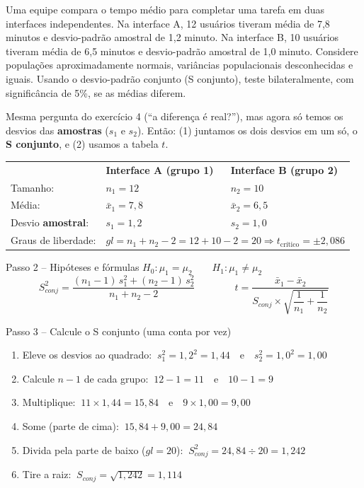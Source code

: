 \documentclass[12pt,a4paper]{article}
\begin{document}
\begin{enunciado}
Uma equipe compara o tempo médio para completar uma tarefa em duas interfaces independentes. Na interface A, 12 usuários tiveram média de 7,8 minutos e desvio-padrão amostral de 1,2 minuto. Na interface B, 10 usuários tiveram média de 6,5 minutos e desvio-padrão amostral de 1,0 minuto. Considere populações aproximadamente normais, variâncias populacionais desconhecidas e iguais. Usando o desvio-padrão conjunto (S conjunto), teste bilateralmente, com significância de 5\%, se as médias diferem.
\end{enunciado}

\begin{traducao}
Mesma pergunta do exercício 4 (``a diferença é real?''), mas agora só temos os desvios das \textbf{amostras} ($s_1$ e $s_2$). Então: (1) juntamos os dois desvios em um só, o \textbf{S conjunto}, e (2) usamos a tabela \textbf{$t$}.
\end{traducao}

\begin{dados}
\begin{tabular}{lll}
 & \textbf{Interface A (grupo 1)} & \textbf{Interface B (grupo 2)} \\
Tamanho: & $n_1 = 12$ & $n_2 = 10$ \\
Média: & $\bar{x}_1 = 7,8$ & $\bar{x}_2 = 6,5$ \\
Desvio \textbf{amostral}: & $s_1 = 1,2$ & $s_2 = 1,0$ \\
Graus de liberdade: & \multicolumn{2}{l}{$gl = n_1 + n_2 - 2 = 12 + 10 - 2 = 20 \Rightarrow t_{\text{crítico}} = \pm 2,086$}
\end{tabular}
\end{dados}

\begin{passo}{Passo 2 -- Hipóteses e fórmulas}
$H_0: \mu_1 = \mu_2 \qquad H_1: \mu_1 \neq \mu_2$
\[
S_{conj}^2 = \frac{(n_1-1)\,s_1^2 + (n_2-1)\,s_2^2}{n_1+n_2-2}
\qquad\qquad
t = \frac{\bar{x}_1 - \bar{x}_2}{S_{conj}\times\sqrt{\dfrac{1}{n_1}+\dfrac{1}{n_2}}}
\]
\end{passo}

\begin{passo}{Passo 3 -- Calcule o S conjunto (uma conta por vez)}
\begin{enumerate}[leftmargin=*,itemsep=2pt]
  \item Eleve os desvios ao quadrado: $\ s_1^2 = 1,2^2 = 1,44 \quad\text{e}\quad s_2^2 = 1,0^2 = 1,00$
  \item Calcule $n-1$ de cada grupo: $\ 12 - 1 = 11 \quad\text{e}\quad 10 - 1 = 9$
  \item Multiplique: $\ 11 \times 1,44 = 15,84 \quad\text{e}\quad 9 \times 1,00 = 9,00$
  \item Some (parte de cima): $\ 15,84 + 9,00 = 24,84$
  \item Divida pela parte de baixo ($gl = 20$): $\ S_{conj}^2 = 24,84 \div 20 = 1,242$
  \item Tire a raiz: $\ S_{conj} = \sqrt{1,242} = 1,114$
\end{enumerate}
\end{passo}
\end{document}
